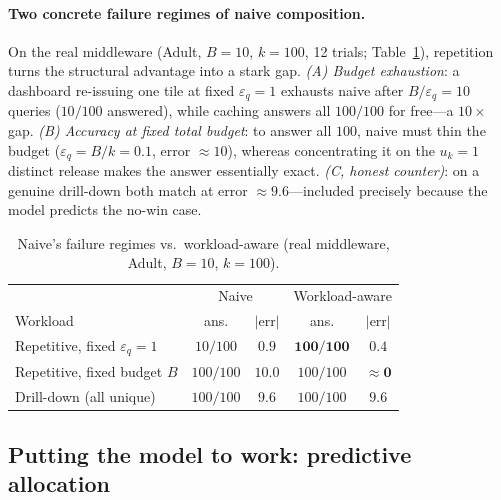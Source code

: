 \documentclass[sigconf,nonacm]{acmart}
\newcommand{\eps}{\varepsilon}
\begin{document}
\paragraph{Two concrete failure regimes of naive composition.}
On the real middleware (Adult, $B{=}10$, $k{=}100$, 12 trials; Table~\ref{tab:killer}), repetition turns the structural advantage into a stark gap. \emph{(A) Budget exhaustion}: a dashboard re-issuing one tile at fixed $\eps_q{=}1$ exhausts naive after $B/\eps_q{=}10$ queries ($10/100$ answered), while caching answers all $100/100$ for free---a $10\times$ gap. \emph{(B) Accuracy at fixed total budget}: to answer all $100$, naive must thin the budget ($\eps_q{=}B/k{=}0.1$, error $\approx10$), whereas concentrating it on the $u_k{=}1$ distinct release makes the answer essentially exact. \emph{(C, honest counter)}: on a genuine drill-down both match at error $\approx9.6$---included precisely because the model predicts the no-win case.

\begin{table}[h]
\footnotesize\centering
\caption{Naive's failure regimes vs.\ workload-aware (real middleware, Adult, $B{=}10$, $k{=}100$).}
\label{tab:killer}
\begin{tabular}{l|cc|cc}
\toprule
& \multicolumn{2}{c|}{Naive} & \multicolumn{2}{c}{Workload-aware} \\
Workload & ans. & $|$err$|$ & ans. & $|$err$|$ \\
\midrule
Repetitive, fixed $\eps_q{=}1$ & $10/100$ & $0.9$ & $\mathbf{100/100}$ & $0.4$ \\
Repetitive, fixed budget $B$ & $100/100$ & $10.0$ & $100/100$ & $\mathbf{\approx0}$ \\
Drill-down (all unique) & $100/100$ & $9.6$ & $100/100$ & $9.6$ \\
\bottomrule
\end{tabular}
\end{table}

\subsection{Putting the model to work: predictive allocation}
\end{document}
